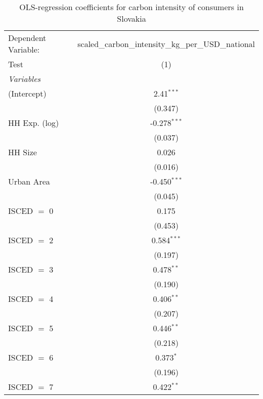 
\begin{table}[htbp!]
   \centering
   \small
   \begin{adjustbox}{width = 1\textwidth, max height = 0.95\textheight, center}
      \begin{threeparttable}[b]
         \caption{\label{tab:OLS_1_SVK} OLS-regression coefficients for carbon intensity of consumers in Slovakia}
         \begin{tabular}{lc}
            \tabularnewline \midrule \midrule
            Dependent Variable: & scaled\_carbon\_intensity\_kg\_per\_USD\_national\\        
            Test                & (1)\\  
            \midrule
            \emph{Variables}\\
            (Intercept)         & 2.41$^{***}$\\   
                                & (0.347)\\   
            HH Exp. (log)       & -0.278$^{***}$\\   
                                & (0.037)\\   
            HH Size             & 0.026\\   
                                & (0.016)\\   
            Urban Area          & -0.450$^{***}$\\   
                                & (0.045)\\   
            ISCED $=$ 0         & 0.175\\   
                                & (0.453)\\   
            ISCED $=$ 2         & 0.584$^{***}$\\   
                                & (0.197)\\   
            ISCED $=$ 3         & 0.478$^{**}$\\   
                                & (0.190)\\   
            ISCED $=$ 4         & 0.406$^{**}$\\   
                                & (0.207)\\   
            ISCED $=$ 5         & 0.446$^{**}$\\   
                                & (0.218)\\   
            ISCED $=$ 6         & 0.373$^{*}$\\   
                                & (0.196)\\   
            ISCED $=$ 7         & 0.422$^{**}$\\   

\end{tabular}
\end{threeparttable}
\end{adjustbox}
\end{table}
